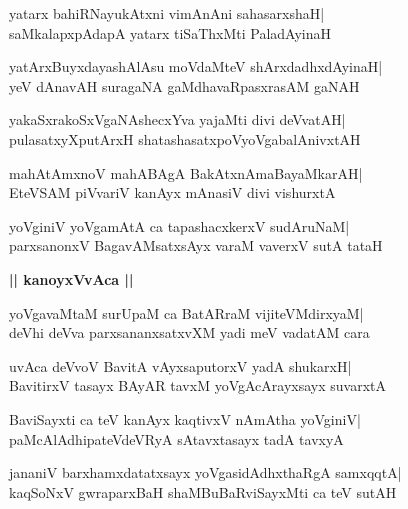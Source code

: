 \documentclass[twoside,12pt,openright]{book}
\newcounter{shloka}[chapter]
\def\uvaca#1{\centerline{{\large\textbf{#1}}}}
\begin{document}
\begin{shloka}%
yatarx bahiRNayukAtxni vimAnAni sahasarxshaH|\\
saMkalapxpAdapA yatarx tiSaThxMti PaladAyinaH
\end{shloka}

\begin{shloka}%
yatArxBuyxdayashAlAsu moVdaMteV shArxdadhxdAyinaH|\\
yeV dAnavAH suragaNA gaMdhavaRpasxrasAM gaNAH
\end{shloka}

\begin{shloka}%
yakaSxrakoSxVgaNAshecxYva yajaMti divi deVvatAH|\\
pulasatxyXputArxH shatashasatxpoVyoVgabalAnivxtAH
\end{shloka}

\begin{shloka}%
mahAtAmxnoV mahABAgA BakAtxnAmaBayaMkarAH|\\
EteVSAM piVvariV kanAyx mAnasiV divi vishurxtA
\end{shloka}

\begin{shloka}%
yoVginiV yoVgamAtA ca tapashacxkerxV sudAruNaM|\\
parxsanonxV BagavAMsatxsAyx varaM vaverxV sutA tataH
\end{shloka}

\uvaca{|| kanoyxVvAca ||}
\begin{shloka}%
yoVgavaMtaM surUpaM ca BatARraM vijiteVMdirxyaM|\\
deVhi deVva parxsananxsatxvXM yadi meV vadatAM cara
\end{shloka}

\begin{shloka}%
uvAca deVvoV BavitA vAyxsaputorxV yadA shukarxH|\\
BavitirxV tasayx BAyAR tavxM yoVgAcArayxsayx suvarxtA
\end{shloka}

\begin{shloka}%
BaviSayxti ca teV kanAyx kaqtivxV nAmAtha yoVginiV|\\
paMcAlAdhipateVdeVRyA sAtavxtasayx tadA tavxyA
\end{shloka}

\begin{shloka}%
jananiV barxhamxdatatxsayx yoVgasidAdhxthaRgA samxqqtA|\\
kaqSoNxV gwraparxBaH shaMBuBaRviSayxMti ca teV sutAH
\end{shloka}
\end{document}
